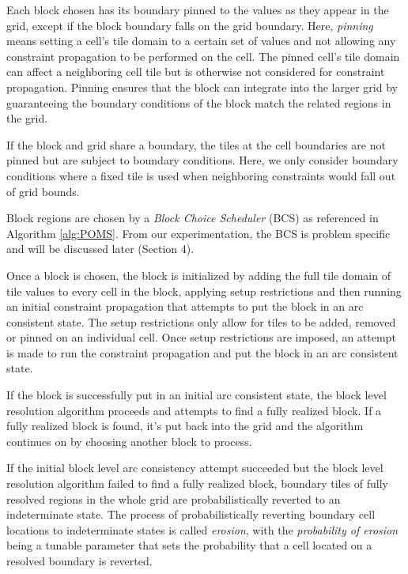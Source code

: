 Each block chosen has its boundary pinned to the values as they appear in the grid,
except if the block boundary falls on the grid boundary.
Here, \textit{pinning} means setting a cell's tile domain to a certain set of values
and not allowing any constraint propagation to be performed on the cell.
The pinned cell's tile domain can affect a neighboring cell tile but is otherwise not
considered for constraint propagation.
Pinning ensures that the block can integrate into the larger grid by guaranteeing
the boundary conditions of the block match the related regions in the grid.

If the block and grid share a boundary, the tiles at the cell boundaries are not
pinned but are subject to boundary conditions.
Here, we only consider boundary conditions where a fixed tile is used when neighboring
constraints would fall out of grid bounds.

Block regions are chosen by a \textit{Block Choice Scheduler} (BCS) as referenced in Algorithm \ref{alg:POMS}.
From our experimentation, the BCS is problem specific and will be discussed later (Section 4).

Once a block is chosen, the block is initialized by adding the full tile domain of tile values
to every cell in the block, applying setup restrictions and then running an initial constraint propagation
that attempts to put the block in an arc consistent state.
The setup restrictions only allow for tiles to be added, removed
or pinned on an individual cell.
Once setup restrictions are imposed, an attempt is made to run the constraint propagation and
put the block in an arc consistent state.

If the block is successfully put in an initial arc consistent state, the block level resolution algorithm proceeds and attempts to find a fully realized block.
If a fully realized block is found, it's put back into the grid and the algorithm
continues on by choosing another block to process.

If the initial block level arc consistency attempt succeeded but the block level resolution
algorithm failed to find a fully realized block,
boundary tiles of fully resolved regions in the whole grid are probabilistically reverted to an indeterminate state.
The process of probabilistically reverting boundary cell locations to indeterminate states is called \textit{erosion},
with the \textit{probability of erosion} being a tunable parameter that sets the probability that a cell located on a resolved boundary
is reverted.


